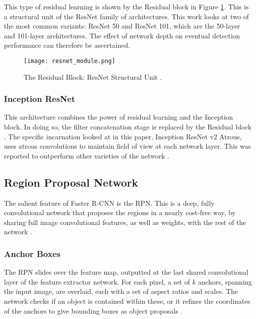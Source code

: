\documentclass[journal]{IEEEtran}
\begin{document}
This type of residual learning is shown by the Residual block in Figure \ref{fig:resnet_module}. This is a structural unit of the ResNet family of architectures. This work looks at two of the most common variants: ResNet 50 and ResNet 101, which are the 50-layer and 101-layer architectures. The effect of network depth on eventual detection performance can therefore be ascertained.


\begin{figure}[H]
    \centering
    \texttt{[image: resnet\_module.png]}
    \caption{The Residual Block: ResNet Structural Unit \cite{reviewpaperpakistan}.}
    \label{fig:resnet_module}
\end{figure}




\subsubsection{Inception ResNet}
This architecture combines the power of residual learning and the Inception block. In doing so, the filter concatenation stage is replaced by the Residual block \cite{reviewpaperpakistan} \cite{inceptionresnet}. The specific incarnation looked at in this paper, Inception ResNet v2 Atrous, uses atrous convolutions to maintain field of view at each network layer. This was reported to outperform other varieties of the network \cite{modelzoo}.








\subsection{Region Proposal Network}
The salient feature of Faster R-CNN is the RPN. This is a deep, fully convolutional network that proposes the regions in a nearly cost-free way, by sharing full image convolutional features, as well as weights, with the rest of the network \cite{detectionreview}. 

\subsubsection{Anchor Boxes}
The RPN slides over the feature map, outputted at the last shared convolutional layer of the feature extractor network. For each pixel, a set of $k$ anchors, spanning the input image, are overlaid, each with a set of aspect ratios and scales. The network checks if an object is contained within these, or it refines the coordinates of the anchors to give bounding boxes as object proposals \cite{objectdetectionatechnicalsummary}. 
\end{document}
